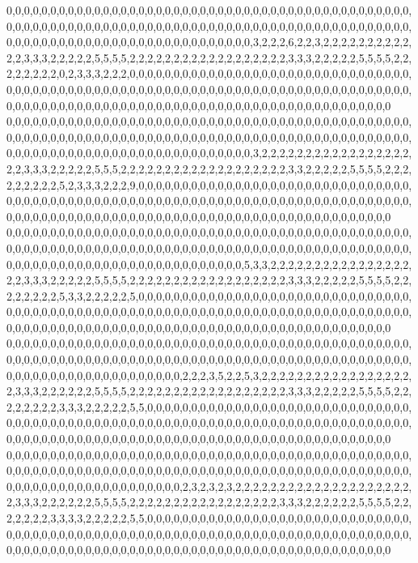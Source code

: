 0,0,0,0,0,0,0,0,0,0,0,0,0,0,0,0,0,0,0,0,0,0,0,0,0,0,0,0,0,0,0,0,0,0,0,0,0,0,0,0,0,0,0,0,0,0,0,0,0,0,0,0,0,0,0,0,0,0,0,0,0,0,0,0,0,0,0,0,0,0,0,0,0,0,0,0,0,0,0,0,0,0,0,0,0,0,0,0,0,0,0,0,0,0,0,0,0,0,0,0,0,0,0,0,0,0,0,0,0,0,0,0,0,0,0,0,0,0,0,0,3,2,2,2,6,2,2,3,2,2,2,2,2,2,2,2,2,2,2,2,3,3,3,2,2,2,2,2,5,5,5,5,2,2,2,2,2,2,2,2,2,2,2,2,2,2,2,2,2,2,3,3,3,2,2,2,2,2,5,5,5,5,2,2,2,2,2,2,2,2,0,2,3,3,3,2,2,2,0,0,0,0,0,0,0,0,0,0,0,0,0,0,0,0,0,0,0,0,0,0,0,0,0,0,0,0,0,0,0,0,0,0,0,0,0,0,0,0,0,0,0,0,0,0,0,0,0,0,0,0,0,0,0,0,0,0,0,0,0,0,0,0,0,0,0,0,0,0,0,0,0,0,0,0,0,0,0,0,0,0,0,0,0,0,0,0,0,0,0,0,0,0,0,0,0,0,0,0,0,0,0,0,0,0,0,0,0,0,0,0,0,0,0,0,0,0,0,0,0,0
0,0,0,0,0,0,0,0,0,0,0,0,0,0,0,0,0,0,0,0,0,0,0,0,0,0,0,0,0,0,0,0,0,0,0,0,0,0,0,0,0,0,0,0,0,0,0,0,0,0,0,0,0,0,0,0,0,0,0,0,0,0,0,0,0,0,0,0,0,0,0,0,0,0,0,0,0,0,0,0,0,0,0,0,0,0,0,0,0,0,0,0,0,0,0,0,0,0,0,0,0,0,0,0,0,0,0,0,0,0,0,0,0,0,0,0,0,0,0,0,3,2,2,2,2,2,2,2,2,2,2,2,2,2,2,2,2,2,2,2,3,3,3,2,2,2,2,2,5,5,5,2,2,2,2,2,2,2,2,2,2,2,2,2,2,2,2,2,2,2,3,3,2,2,2,2,2,5,5,5,5,2,2,2,2,2,2,2,2,2,5,2,3,3,3,2,2,2,9,0,0,0,0,0,0,0,0,0,0,0,0,0,0,0,0,0,0,0,0,0,0,0,0,0,0,0,0,0,0,0,0,0,0,0,0,0,0,0,0,0,0,0,0,0,0,0,0,0,0,0,0,0,0,0,0,0,0,0,0,0,0,0,0,0,0,0,0,0,0,0,0,0,0,0,0,0,0,0,0,0,0,0,0,0,0,0,0,0,0,0,0,0,0,0,0,0,0,0,0,0,0,0,0,0,0,0,0,0,0,0,0,0,0,0,0,0,0,0,0,0
0,0,0,0,0,0,0,0,0,0,0,0,0,0,0,0,0,0,0,0,0,0,0,0,0,0,0,0,0,0,0,0,0,0,0,0,0,0,0,0,0,0,0,0,0,0,0,0,0,0,0,0,0,0,0,0,0,0,0,0,0,0,0,0,0,0,0,0,0,0,0,0,0,0,0,0,0,0,0,0,0,0,0,0,0,0,0,0,0,0,0,0,0,0,0,0,0,0,0,0,0,0,0,0,0,0,0,0,0,0,0,0,0,0,0,0,0,0,0,5,3,3,2,2,2,2,2,2,2,2,2,2,2,2,2,2,2,2,2,2,3,3,3,2,2,2,2,2,5,5,5,5,2,2,2,2,2,2,2,2,2,2,2,2,2,2,2,2,2,2,3,3,3,2,2,2,2,2,5,5,5,5,2,2,2,2,2,2,2,2,5,3,3,2,2,2,2,2,5,0,0,0,0,0,0,0,0,0,0,0,0,0,0,0,0,0,0,0,0,0,0,0,0,0,0,0,0,0,0,0,0,0,0,0,0,0,0,0,0,0,0,0,0,0,0,0,0,0,0,0,0,0,0,0,0,0,0,0,0,0,0,0,0,0,0,0,0,0,0,0,0,0,0,0,0,0,0,0,0,0,0,0,0,0,0,0,0,0,0,0,0,0,0,0,0,0,0,0,0,0,0,0,0,0,0,0,0,0,0,0,0,0,0,0,0,0,0,0,0,0
0,0,0,0,0,0,0,0,0,0,0,0,0,0,0,0,0,0,0,0,0,0,0,0,0,0,0,0,0,0,0,0,0,0,0,0,0,0,0,0,0,0,0,0,0,0,0,0,0,0,0,0,0,0,0,0,0,0,0,0,0,0,0,0,0,0,0,0,0,0,0,0,0,0,0,0,0,0,0,0,0,0,0,0,0,0,0,0,0,0,0,0,0,0,0,0,0,0,0,0,0,0,0,0,0,0,0,0,0,0,0,0,2,2,2,3,5,2,2,5,3,2,2,2,2,2,2,2,2,2,2,2,2,2,2,2,2,2,2,3,3,3,2,2,2,2,2,2,5,5,5,5,2,2,2,2,2,2,2,2,2,2,2,2,2,2,2,2,2,2,3,3,3,2,2,2,2,2,5,5,5,5,2,2,2,2,2,2,2,2,3,3,3,2,2,2,2,2,5,5,0,0,0,0,0,0,0,0,0,0,0,0,0,0,0,0,0,0,0,0,0,0,0,0,0,0,0,0,0,0,0,0,0,0,0,0,0,0,0,0,0,0,0,0,0,0,0,0,0,0,0,0,0,0,0,0,0,0,0,0,0,0,0,0,0,0,0,0,0,0,0,0,0,0,0,0,0,0,0,0,0,0,0,0,0,0,0,0,0,0,0,0,0,0,0,0,0,0,0,0,0,0,0,0,0,0,0,0,0,0,0,0,0,0,0,0,0,0,0,0
0,0,0,0,0,0,0,0,0,0,0,0,0,0,0,0,0,0,0,0,0,0,0,0,0,0,0,0,0,0,0,0,0,0,0,0,0,0,0,0,0,0,0,0,0,0,0,0,0,0,0,0,0,0,0,0,0,0,0,0,0,0,0,0,0,0,0,0,0,0,0,0,0,0,0,0,0,0,0,0,0,0,0,0,0,0,0,0,0,0,0,0,0,0,0,0,0,0,0,0,0,0,0,0,0,0,0,0,0,0,0,0,2,3,2,3,2,3,2,2,2,2,2,2,2,2,2,2,2,2,2,2,2,2,2,2,2,2,2,3,3,3,2,2,2,2,2,2,5,5,5,5,2,2,2,2,2,2,2,2,2,2,2,2,2,2,2,2,2,3,3,3,2,2,2,2,2,2,5,5,5,5,2,2,2,2,2,2,2,3,3,3,3,2,2,2,2,2,5,5,0,0,0,0,0,0,0,0,0,0,0,0,0,0,0,0,0,0,0,0,0,0,0,0,0,0,0,0,0,0,0,0,0,0,0,0,0,0,0,0,0,0,0,0,0,0,0,0,0,0,0,0,0,0,0,0,0,0,0,0,0,0,0,0,0,0,0,0,0,0,0,0,0,0,0,0,0,0,0,0,0,0,0,0,0,0,0,0,0,0,0,0,0,0,0,0,0,0,0,0,0,0,0,0,0,0,0,0,0,0,0,0,0,0,0,0,0,0,0,0
